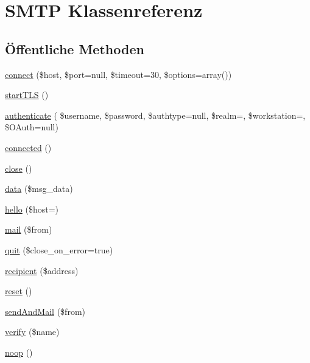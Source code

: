 \hypertarget{class_s_m_t_p}{}\section{S\+M\+TP Klassenreferenz}
\label{class_s_m_t_p}
\subsection*{Öffentliche Methoden}
\begin{DoxyCompactItemize}
\item 
\mbox{\hyperlink{class_s_m_t_p_a99878ea0fb6aac693f8d91cc3b7d1944}{connect}} (\$host, \$port=null, \$timeout=30, \$options=array())
\item 
\mbox{\hyperlink{class_s_m_t_p_af073b18f8e00a63c94c04ac77b21343d}{start\+T\+LS}} ()
\item 
\mbox{\hyperlink{class_s_m_t_p_ad440c7b08d3cefc810df92cb187fe665}{authenticate}} ( \$username, \$password, \$authtype=null, \$realm=\textquotesingle{}\textquotesingle{}, \$workstation=\textquotesingle{}\textquotesingle{}, \$O\+Auth=null)
\item 
\mbox{\hyperlink{class_s_m_t_p_a36ba343057efdbb7bec92a37539b8c8d}{connected}} ()
\item 
\mbox{\hyperlink{class_s_m_t_p_a3195ed3234db281e18a203013c286bbf}{close}} ()
\item 
\mbox{\hyperlink{class_s_m_t_p_ae5ae69f15530c34b0d40db955a83679c}{data}} (\$msg\+\_\+data)
\item 
\mbox{\hyperlink{class_s_m_t_p_af1bb1a12327aa53955758265a10f5d05}{hello}} (\$host=\textquotesingle{}\textquotesingle{})
\item 
\mbox{\hyperlink{class_s_m_t_p_a16a15ec2e5bf36519815f7a0160b7ec1}{mail}} (\$from)
\item 
\mbox{\hyperlink{class_s_m_t_p_a4125d346dff5846eb228cc3db180b254}{quit}} (\$close\+\_\+on\+\_\+error=true)
\item 
\mbox{\hyperlink{class_s_m_t_p_ae81a24cd96bcd70612f7ee66c03576f5}{recipient}} (\$address)
\item 
\mbox{\hyperlink{class_s_m_t_p_a921087a737bbc78e78bbe798de7e4273}{reset}} ()
\item 
\mbox{\hyperlink{class_s_m_t_p_a5ccb22f089373bf27e9968f4cc5cfcf5}{send\+And\+Mail}} (\$from)
\item 
\mbox{\hyperlink{class_s_m_t_p_ab7bf68a2c0027e8c7a99476d93590489}{verify}} (\$name)
\item 
\mbox{\hyperlink{class_s_m_t_p_a8e5454df733f222c1deb352f05ddf82d}{noop}} ()

\end{DoxyCompactItemize}

